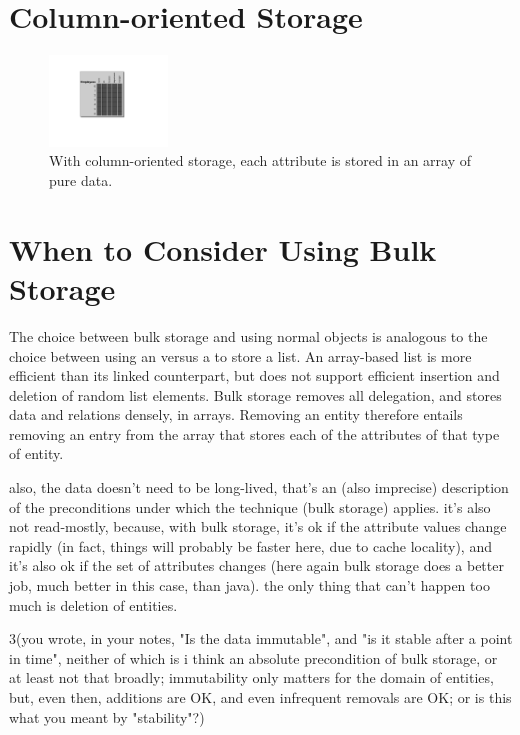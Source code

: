 \section{Column-oriented Storage}
\begin{figure}
\centering
   \vspace{-3mm}
   \includegraphics[width=0.28\textwidth]{part3/Figures/extreme/EC-example-for-columns2}
   \caption{With column-oriented storage, each attribute is stored in an array
   of pure data.}
\end{figure}


\section{When to Consider Using Bulk Storage}
\label{sec:when-bulk-storage-is-applicable}
The choice between bulk storage and using normal objects is analogous to the
choice between using an  versus a  to store a
list. An array-based list is more efficient than its linked counterpart, but
does not support efficient insertion and deletion of random list elements. Bulk
storage removes all delegation, and stores data and relations densely, in
arrays. Removing an entity therefore entails removing an entry from the array
that stores each of the attributes of that type of entity.

 

also, the data doesn't need to be long-lived, that's an (also imprecise)
description of the preconditions under which the technique (bulk storage)
applies. it's also not read-mostly, because, with bulk storage, it's ok if the
attribute values change rapidly (in fact, things will probably be faster here,
due to cache locality), and it's also ok if the set of attributes changes (here
again bulk storage does a better job, much better in this case, than java). the
only thing that can't happen too much is deletion of entities.

3(you wrote, in your notes, "Is the data immutable", and "is it stable after a
point in time", neither of which is i think an absolute precondition of bulk
storage, or at least not that broadly; immutability only matters for the domain
of entities, but, even then, additions are OK, and even infrequent removals are
OK; or is this what you meant by "stability"?)

